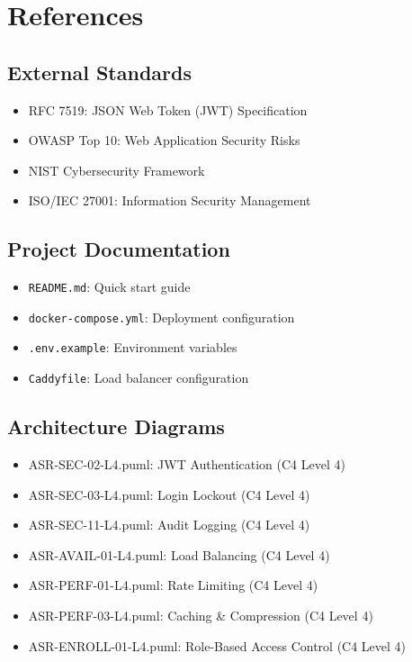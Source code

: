 \documentclass[12pt,oneside,a4paper]{article}
\begin{document}
\newpage

\section{References}

\subsection{External Standards}
\begin{itemize}
    \item RFC 7519: JSON Web Token (JWT) Specification
    \item OWASP Top 10: Web Application Security Risks
    \item NIST Cybersecurity Framework
    \item ISO/IEC 27001: Information Security Management
\end{itemize}

\subsection{Project Documentation}
\begin{itemize}
    \item \texttt{README.md}: Quick start guide
    \item \texttt{docker-compose.yml}: Deployment configuration
    \item \texttt{.env.example}: Environment variables
    \item \texttt{Caddyfile}: Load balancer configuration
\end{itemize}

\subsection{Architecture Diagrams}
\begin{itemize}
    \item ASR-SEC-02-L4.puml: JWT Authentication (C4 Level 4)
    \item ASR-SEC-03-L4.puml: Login Lockout (C4 Level 4)
    \item ASR-SEC-11-L4.puml: Audit Logging (C4 Level 4)
    \item ASR-AVAIL-01-L4.puml: Load Balancing (C4 Level 4)
    \item ASR-PERF-01-L4.puml: Rate Limiting (C4 Level 4)
    \item ASR-PERF-03-L4.puml: Caching \& Compression (C4 Level 4)
    \item ASR-ENROLL-01-L4.puml: Role-Based Access Control (C4 Level 4)
\end{itemize}
\end{document}
